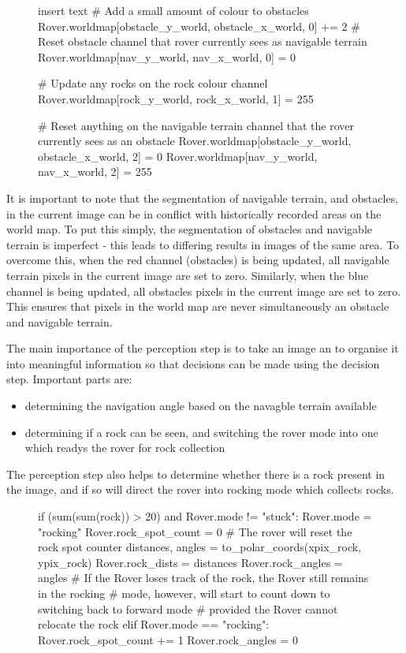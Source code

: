 \documentclass[a4paper]{article}
\begin{document}
\begin{figure}[h]\scriptsize
\begin{sexylisting}{insert text}
# Add a small amount of colour to obstacles
    Rover.worldmap[obstacle_y_world, obstacle_x_world, 0] += 2
    # Reset obstacle channel that rover currently sees as navigable terrain
    Rover.worldmap[nav_y_world, nav_x_world, 0] = 0
    
    # Update any rocks on the rock colour channel
    Rover.worldmap[rock_y_world, rock_x_world, 1] = 255 
    
    # Reset anything on the navigable terrain channel that the rover currently sees as an obstacle
    Rover.worldmap[obstacle_y_world, obstacle_x_world, 2] = 0
    Rover.worldmap[nav_y_world, nav_x_world, 2] = 255
\end{sexylisting}
\end{figure}

It is important to note that the segmentation of navigable terrain, and obstacles, in the current image can be in conflict with historically recorded areas on the world map. To put this simply, the segmentation of obstacles and navigable terrain is imperfect - this leads to differing results in images of the same area. To overcome this, when the red channel (obstacles) is being updated, all navigable terrain pixels in the current image are set to zero. Similarly, when the blue channel is being updated, all obstacles pixels in the current image are set to zero. This ensures that pixels in the world map are never simultaneously an obstacle and navigable terrain.

The main importance of the perception step is to take an image an to organise it into meaningful information so that decisions can be made using the decision step. Important parts are:
\begin{itemize}
\item determining the navigation angle based on the navagble terrain available
\item determining if a rock can be seen, and switching the rover mode into one which readys the rover for rock collection
\end{itemize}

The perception step also helps to determine whether there is a rock present in the image, and if so will direct the rover into rocking mode which collects rocks.

\begin{figure}[h]\scriptsize
\begin{sexylisting}
if (sum(sum(rock)) > 20) and Rover.mode != "stuck":
        Rover.mode = "rocking"
        Rover.rock_spot_count = 0 # The rover will reset the rock spot counter
        distances, angles = to_polar_coords(xpix_rock, ypix_rock)
        Rover.rock_dists = distances
        Rover.rock_angles = angles
    # If the Rover loses track of the rock, the Rover still remains in the rocking
    # mode, however, will start to count down to switching back to forward mode
    # provided the Rover cannot relocate the rock
    elif Rover.mode == "rocking":
        Rover.rock_spot_count += 1
        Rover.rock_angles = 0
\end{sexylisting}
\end{figure}
\end{document}
